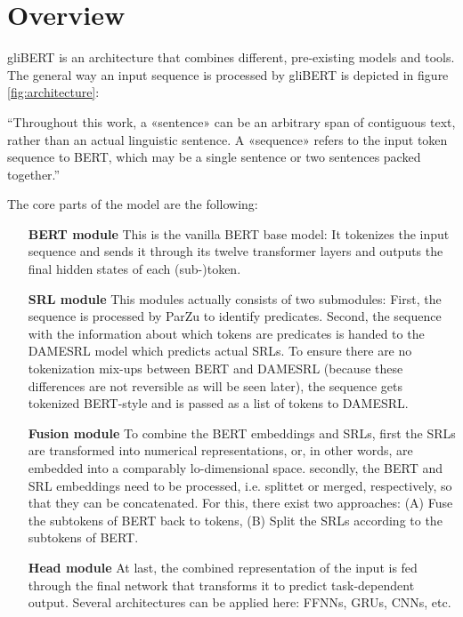 
\label{chap:4_architecture}

\section{Overview}

gliBERT is an architecture that combines different, pre-existing models and tools.
The general way an input sequence is processed by gliBERT is depicted in figure \ref{fig:architecture}:


``Throughout this work, a «sentence» can be an arbitrary span of contiguous text, rather than an actual linguistic sentence. A «sequence» refers to the input token sequence to BERT, which may be a single sentence or two sentences packed together.'' \citep{devlin2018bert}



The core parts of the model are the following:

\begin{itemize}
	\item[\textbf{BERT module}] This is the vanilla BERT base model: It tokenizes the input sequence and sends it through its twelve transformer layers and outputs the final hidden states of each (sub-)token.
  \item[\textbf{SRL module}] This modules actually consists of two submodules: First, the sequence is processed by ParZu to identify predicates.
	Second, the sequence with the information about which tokens are predicates is handed to the DAMESRL model which predicts actual SRLs.
	To ensure there are no tokenization mix-ups between BERT and DAMESRL (because these differences are not reversible as will be seen later), the sequence gets tokenized BERT-style and is passed as a list of tokens to DAMESRL.
  \item[\textbf{Fusion module}] To combine the BERT embeddings and SRLs, first the SRLs are transformed into numerical representations, or, in other words, are embedded into a comparably lo-dimensional space.
	secondly, the BERT and SRL embeddings need to be processed, i.e. splittet or merged, respectively, so that they can be concatenated.
	For this, there exist two approaches:
	(A) Fuse the subtokens of BERT back to tokens, (B) Split the SRLs according to the subtokens of BERT.
  \item[\textbf{Head module}] At last, the combined representation of the input is fed through the final network that transforms it to predict task-dependent output. Several architectures can be applied here: FFNNs, GRUs, CNNs, etc.
\end{itemize}

